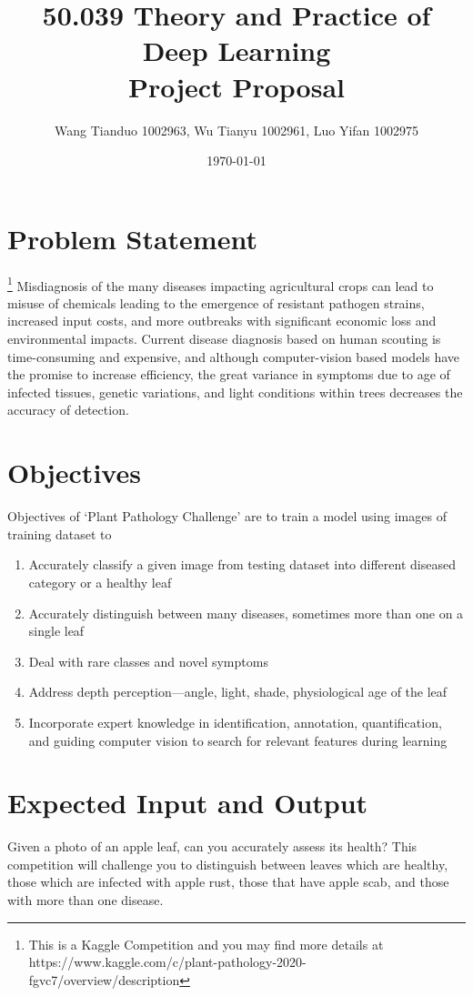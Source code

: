 \documentclass{article}
\begin{document}
\title{
50.039 Theory and Practice of Deep Learning \\
Project Proposal
}

\author{Wang Tianduo 1002963, Wu Tianyu 1002961, Luo Yifan 1002975}
\date{\today}
\maketitle

\section{Problem Statement}\footnote{This is a Kaggle Competition and you may find more details at \\ https://www.kaggle.com/c/plant-pathology-2020-fgvc7/overview/description}
Misdiagnosis of the many diseases impacting agricultural crops can lead to misuse of chemicals leading to the emergence of resistant pathogen strains, increased input costs, and more outbreaks with significant economic loss and environmental impacts. Current disease diagnosis based on human scouting is time-consuming and expensive, and although computer-vision based models have the promise to increase efficiency, the great variance in symptoms due to age of infected tissues, genetic variations, and light conditions within trees decreases the accuracy of detection.

\section{Objectives}
Objectives of ‘Plant Pathology Challenge’ are to train a model using images of training dataset to 
\begin{enumerate}
    \item Accurately classify a given image from testing dataset into different diseased category or a healthy leaf
    \item Accurately distinguish between many diseases, sometimes more than one on a single leaf
    \item Deal with rare classes and novel symptoms
    \item Address depth perception—angle, light, shade, physiological age of the leaf
    \item Incorporate expert knowledge in identification, annotation, quantification, and guiding computer vision to search for relevant features during learning
\end{enumerate}

\section{Expected Input and Output}
Given a photo of an apple leaf, can you accurately assess its health? This competition will challenge you to distinguish between leaves which are healthy, those which are infected with apple rust, those that have apple scab, and those with more than one disease.
\end{document}
